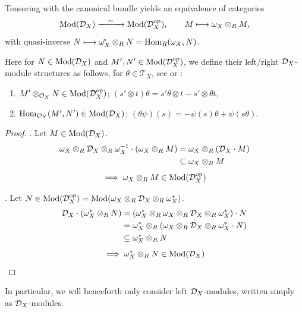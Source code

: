 \begin{theorem}\label{thm:left-right-equivalence}
    Tensoring with the canonical bundle yields an equivalence of categories
    \[
        \mathrm{Mod}(\mathcal{D}_X) \xrightarrow{\quad\sim\quad} \mathrm{Mod}(\mathcal{D}_X^{\mathrm{op}}),\qquad M\longmapsto \omega_X\otimes_R M,
    \]
    with quasi-inverse $N\longmapsto \omega_X^{\!*}\otimes_R N = \operatorname{Hom}_R(\omega_X,N)$.

    Here for $N \in \mathrm{Mod}(\mathcal{D}_X)$ and $M', N' \in \mathrm{Mod}(\mathcal{D}_X^{\mathrm{op}})$,
    we define their left/right $\mathcal{D}_X$-module structures as follows,
    for $\theta \in \mathcal{T}_X$, see \cite[Proposition~1.2.9]{hotta2008d} or \cite[Exercise~8.12,~8.13]{SabbahSchnell_MHMChap8_TrainingDModules}:
    \begin{enumerate}
        \item $M' \otimes_{\mathcal{O}_X} N \in \mathrm{Mod}(\mathcal{D}_X^{\mathrm{op}})$;
              \quad $(s' \otimes t)\theta = s'\theta \otimes t - s' \otimes \theta t$,
        \item $\operatorname{Hom}_{\mathcal{O}_X}(M', N') \in \mathrm{Mod}(\mathcal{D}_X)$;
              \quad $(\theta\psi)(s) = -\psi(s)\theta + \psi(s\theta)$.
    \end{enumerate}
\end{theorem}

\begin{proof}
    . Let $M \in \mathrm{Mod}(\mathcal{D}_X)$.
    \begin{align*}
        \omega_X \otimes_R \mathcal{D}_X \otimes_R \omega_X^{-1} \cdot (\omega_X \otimes_R M)
         & = \omega_X \otimes_R (\mathcal{D}_X \cdot M) \\
         & \subseteq \omega_X \otimes_R M
    \end{align*}
    \[
        \implies \omega_X \otimes_R M \in \mathrm{Mod}(\mathcal{D}_X^{\mathrm{op}})
    \]

    . Let $N \in \mathrm{Mod}(\mathcal{D}_X^{\mathrm{op}}) = \mathrm{Mod}(\omega_X \otimes_R \mathcal{D}_X \otimes_R \omega_X^*)$.
    \begin{align*}
        \mathcal{D}_X \cdot (\omega_X^* \otimes_R N)
         & = (\omega_X^* \otimes_R \omega_X \otimes_R \mathcal{D}_X \otimes_R \omega_X^*) \cdot N \\
         & = \omega_X^* \otimes_R (\omega_X \otimes_R \mathcal{D}_X \otimes_R \omega_X^* \cdot N) \\
         & \subseteq \omega_X^* \otimes_R N
    \end{align*}
    \[
        \implies \omega_X^* \otimes_R N \in \mathrm{Mod}(\mathcal{D}_X)
    \]
\end{proof}

In particular, we will henceforth only consider left $\mathcal{D}_X$-modules, written simply as $\mathcal{D}_X$-modules.

